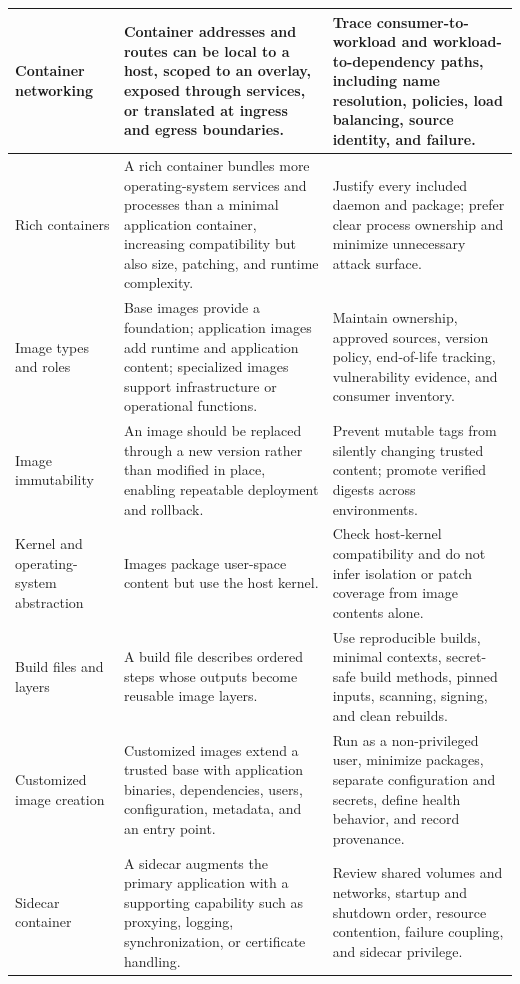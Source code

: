 \documentclass[11pt]{article}
\begin{document}
\begin{longtable}{@{}>{\RaggedRight\arraybackslash}p{}>{\RaggedRight\arraybackslash}p{}>{\RaggedRight\arraybackslash}p{}@{}}
Container networking & Container addresses and routes can be local to a host, scoped to an overlay, exposed through services, or translated at ingress and egress boundaries. & Trace consumer-to-workload and workload-to-dependency paths, including name resolution, policies, load balancing, source identity, and failure. \\\midrule
Rich containers & A rich container bundles more operating-system services and processes than a minimal application container, increasing compatibility but also size, patching, and runtime complexity. & Justify every included daemon and package; prefer clear process ownership and minimize unnecessary attack surface. \\\midrule
Image types and roles & Base images provide a foundation; application images add runtime and application content; specialized images support infrastructure or operational functions. & Maintain ownership, approved sources, version policy, end-of-life tracking, vulnerability evidence, and consumer inventory. \\\midrule
Image immutability & An image should be replaced through a new version rather than modified in place, enabling repeatable deployment and rollback. & Prevent mutable tags from silently changing trusted content; promote verified digests across environments. \\\midrule
Kernel and operating-system abstraction & Images package user-space content but use the host kernel. & Check host-kernel compatibility and do not infer isolation or patch coverage from image contents alone. \\\midrule
Build files and layers & A build file describes ordered steps whose outputs become reusable image layers. & Use reproducible builds, minimal contexts, secret-safe build methods, pinned inputs, scanning, signing, and clean rebuilds. \\\midrule
Customized image creation & Customized images extend a trusted base with application binaries, dependencies, users, configuration, metadata, and an entry point. & Run as a non-privileged user, minimize packages, separate configuration and secrets, define health behavior, and record provenance. \\\midrule
Sidecar container & A sidecar augments the primary application with a supporting capability such as proxying, logging, synchronization, or certificate handling. & Review shared volumes and networks, startup and shutdown order, resource contention, failure coupling, and sidecar privilege. \\\midrule

\end{longtable}
\end{document}
